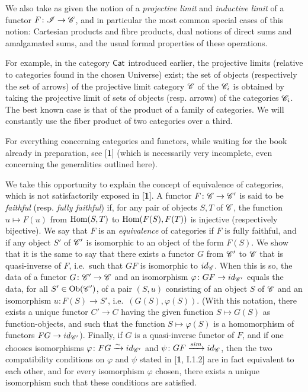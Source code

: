 \documentclass[../main.tex]{subfiles}
\begin{document}
We also take as given the notion of a \emph{projective limit} and \emph{inductive limit} of a functor $F \colon \mathscr{I} \to \mathscr{C}$, and in particular the most common special cases of this notion:
Cartesian products and fibre products, dual notions of direct sums and amalgamated sums, and the usual formal properties of these operations.

For example, in the category $\mathsf{Cat}$ introduced earlier, the projective limits
(relative to categories found in the chosen Universe) exist; the set of objects (respectively the set of arrows) of the projective limit category $\mathscr{C}$ of the $\mathscr{C}_i$ is obtained by taking the projective limit of sets of objects (resp. arrows) of the categories $\mathscr{C}_i$. The best known case is that of the product of a family of
categories. We will constantly use the fiber product of two categories
over a third.

For everything concerning categories and functors, while waiting for the book already in preparation, see [\textbf{1}] (which is necessarily very incomplete, even concerning the generalities outlined here).

We take this opportunity to explain the concept of equivalence of categories, which is not satisfactorily exposed in [\textbf{1}]. 
A functor $F \colon \mathscr{C} \to \mathscr{C}'$ is said to be \emph{faithful} (resp. \emph{fully faithful}) if, for any pair of objects $S, T$ of $\mathscr{C}$, the function $u \mapsto F (u)$ from $\mathrm{Hom} (S, T)$ to $\mathrm{Hom} (F (S), F (T))$ is injective (respectively bijective). 
We say that $F$ is an \emph{equivalence} of categories if $F$ is fully faithful, and if any object $S'$ of $\mathscr{C}'$ is isomorphic to an object of the form $F (S)$.
We show that it is the same to say that there exists a functor $G$ from $\mathscr{C}'$ to $\mathscr{C}$ that is quasi-inverse of $F$, i.e.\ such that $GF$ is isomorphic to $id_{\mathscr{C}}$.
When this is so, the data of a functor $G \colon \mathscr{C}' \to \mathscr{C}$ and an isomorphism $\varphi \colon GF \to id_{\mathscr{C}'}$ equals the data, for all $S' \in \mathrm{Ob} (\mathscr{C}')$, of a pair $(S, u)$ consisting of an object $S$ of $\mathscr{C}$ and an isomorphism $u \colon F (S) \to S'$, i.e.\ $(G (S), \varphi (S))$.
(With this notation, there exists a unique functor $C' \to C$ having the given function $S \mapsto G (S)$ as function-objects, and such that the function $S \mapsto \varphi (S)$ is a homomorphism of functors $FG \to id_{\mathscr{C}'}$).
Finally, if $G$ is a quasi-inverse functor of $F$, and if one chooses isomorphisms $\varphi \colon FG \xrightarrow{\sim} id_{\mathscr{C}'}$ and $\psi \colon GF \xrightarrow{sim} id_{\mathscr{C}}$, then the two compatibility conditions on $\varphi$ and $\psi$ stated in [\textbf{1}, I.1.2] are in fact equivalent to each other, and for every isomorphism $\varphi$ chosen, there exists a unique isomorphism such that these conditions are satisfied.
\end{document}
